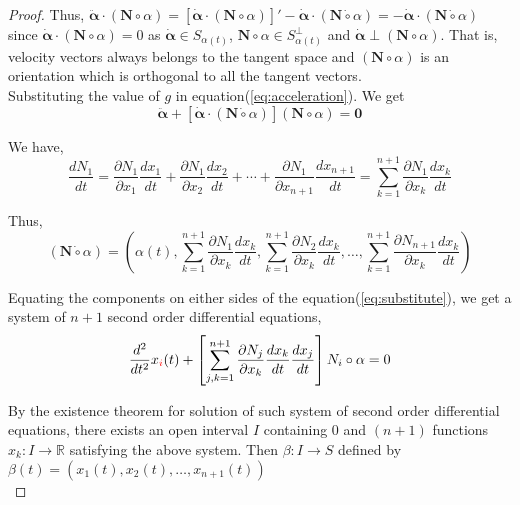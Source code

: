 \begin{proof}
	Thus, $\ddot{\boldsymbol{\alpha}} \cdot (\boldsymbol{N} \circ \alpha) = \left[ \dot{\boldsymbol{\alpha}} \cdot (\boldsymbol{N} \circ \alpha) \right]' - \dot{\boldsymbol{\alpha}} \cdot (\boldsymbol{N} \dot{\circ} \alpha) = -\dot{\boldsymbol{\alpha}} \cdot (\boldsymbol{N} \dot{\circ} \alpha)$ since $\dot{\boldsymbol{\alpha}} \cdot (\boldsymbol{N} \circ \alpha) = 0$ as $\dot{\boldsymbol{\alpha}} \in S_{\alpha(t)}$, $\boldsymbol{N} \circ \alpha \in S_{\alpha(t)}^\perp$ and $\dot{\boldsymbol{\alpha}} \perp (\boldsymbol{N} \circ \alpha)$.
	That is, velocity vectors always belongs to the tangent space and $(\boldsymbol{N} \circ \alpha)$ is an orientation which is orthogonal to all the tangent vectors.\\


	Substituting the value of $g$ in equation(\ref{eq:acceleration}).
	We get 
	\begin{equation}
		\ddot{\boldsymbol{\alpha}} + \left[ \dot{\boldsymbol{\alpha}} \cdot (\boldsymbol{N} \dot{\circ} \alpha) \right] (\boldsymbol{N} \circ \alpha) = \boldsymbol{0}
		\label{eq:substitute}
	\end{equation}

	We have,
	\begin{equation}
		\dfrac{dN_1}{dt} = \dfrac{\partial N_1}{\partial x_1} \dfrac{dx_1}{dt} +  \dfrac{\partial N_1}{\partial x_2} \dfrac{dx_2}{dt} + \dotsb + \dfrac{\partial N_1}{\partial x_{n+1}} \dfrac{dx_{n+1}}{dt} = \sum_{k=1}^{n+1} \dfrac{\partial N_1}{\partial x_k} \dfrac{dx_k}{dt}
	\end{equation}

	Thus,
	\begin{equation}
		(\boldsymbol{N} \dot{\circ} \alpha) = \left( \alpha(t), \sum_{k=1}^{n+1} \dfrac{\partial N_1}{\partial x_k} \dfrac{dx_k}{dt}, \sum_{k=1}^{n+1} \dfrac{\partial N_2}{\partial x_k} \dfrac{dx_k}{dt}, \dots, \sum_{k=1}^{n+1} \dfrac{\partial N_{n+1}}{\partial x_k} \dfrac{dx_k}{dt} \right)
	\end{equation}

	Equating the components on either sides of the equation(\ref{eq:substitute}), we get a system of $n+1$ second order differential equations,
	\begin{equation}
		\dfrac{d^2}{dt^2}x_{\color{red}i}(t) + \left[ \sum_{j,k=1}^{n+1} \dfrac{\partial N_j}{\partial x_k} \dfrac{dx_k}{dt}\dfrac{dx_j}{dt}\right] N_i \circ \alpha = 0
	\end{equation}

	By the existence theorem for solution of such system of second order differential equations, there exists an open interval $I$ containing $0$ and $(n+1)$ functions $x_k : I \to \mathbb{R}$ satisfying the above system.
	Then $\beta : I \to S$ defined by $\beta(t) = \left( x_1(t),x_2(t),\dots,x_{n+1}(t) \right)$\\


\end{proof}
